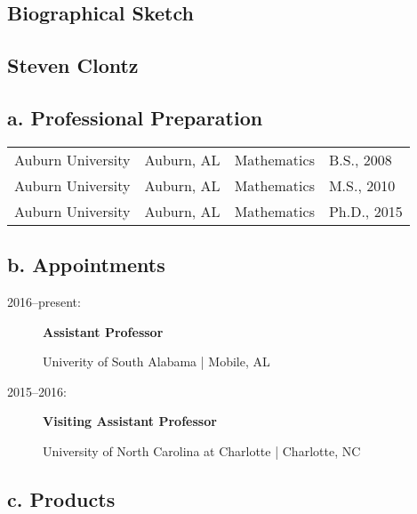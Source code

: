 \documentclass{article}
\begin{document}
\begin{center}
\section*{Biographical Sketch}

\subsection*{Steven Clontz}
\end{center}

\subsection*{a. Professional Preparation}

 \begin{tabular}{llll}
   Auburn University &
      Auburn, AL &
      Mathematics &
      B.S., 2008
      \\
   Auburn University &
      Auburn, AL &
      Mathematics &
      M.S., 2010
      \\
   Auburn University &
      Auburn, AL &
      Mathematics &
      Ph.D., 2015
      \\
 \end{tabular}

\subsection*{b. Appointments}

\begin{description}
  \item[2016--present:] \textbf{Assistant Professor}

  Univerity of South Alabama | Mobile, AL

  \item[2015--2016:] \textbf{Visiting Assistant Professor}

  University of North Carolina at Charlotte | Charlotte, NC
\end{description}



\subsection*{c. Products}
\end{document}
